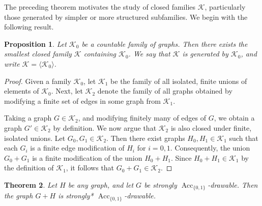 \documentclass{amsart}
\newtheorem{theorem}{Theorem}[section]
\newtheorem{prop}[theorem]{Proposition}
\theoremstyle{plain}
\theoremstyle{definition}
\theoremstyle{remark}
\numberwithin{equation}{section}
\newcommand{\dgreen}{\color{darkgreen}}
\newcommand{\K}{\mathcal{K}}
\DeclareMathOperator{\Acc}{Acc}
\begin{document}
The preceding theorem motivates the study of closed families $\mathcal{K}$, particularly those generated by simpler or more structured subfamilies. We begin with the following result.

\begin{prop}
Let $\mathcal{K}_0$ be a countable family of graphs. Then there exists the smallest closed family $\mathcal{K}$ containing $\mathcal{K}_0$. We say that $\mathcal{K}$ is \emph{generated} by $\mathcal{K}_0$, and write $\K=\langle \K_0\rangle$. 
\end{prop}

\begin{proof}
Given a family $\mathcal{K}_0$, let $\mathcal{K}_1$ be the family of all isolated, finite unions of elements of $\K_0$.  Next, let $\mathcal{K}_2$ denote the family of all graphs obtained by modifying a finite set of edges in some graph from $\mathcal{K}_1$. 

Taking a graph $G \in \K_2$, and modifying finitely many of edges of $G$, we obtain a graph $G' \in \K_2$ by definition. We now argue that $\mathcal{K}_2$ is also closed under finite, isolated unions. Let $G_0, G_1 \in \mathcal{K}_2$. Then there exist graphs $H_0, H_1 \in \mathcal{K}_1$ such that each $G_i$ is a finite edge modification of $H_i$ for $i = 0,1$. Consequently, the union $G_0 + G_1$ is a finite modification of the union $H_0 + H_1$. Since $H_0 + H_1 \in \mathcal{K}_1$ by the definition of $\mathcal{K}_1$, it follows that $G_0 + G_1 \in \mathcal{K}_2$.
\end{proof}


\begin{theorem}
Let \(H\) be any graph, and let \(G\) be strongly \(\Acc_{\{0,1\}}\)-drawable. Then the graph \(G+H\) is strongly* \(\Acc_{\{0,1\}}\)-drawable.\dgreen
\end{theorem}
\end{document}
